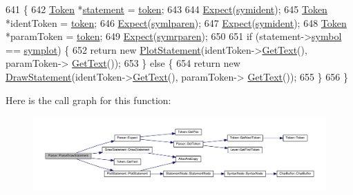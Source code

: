\begin{DoxyCode}
641 \{
642     \hyperlink{structToken}{Token} *\hyperlink{nodes_8h_acac9cbaeea226ed297804c012dc12b16a338f0b1773c656a2647feb9e2bf6be09}{statement} = \hyperlink{classParser_a467028559d31c5b33f16ca8be56715cc}{token};
643 
644     \hyperlink{classParser_a811765334b0cd3f01152c35c9f5bcaec}{Expect}(\hyperlink{lex_8h_a7feef761cd73fac6e25b8bb80d2c4e54ade7694e5efc9616383548e57122faea5}{symident});
645     \hyperlink{structToken}{Token} *identToken = \hyperlink{classParser_a467028559d31c5b33f16ca8be56715cc}{token};
646     \hyperlink{classParser_a811765334b0cd3f01152c35c9f5bcaec}{Expect}(\hyperlink{lex_8h_a7feef761cd73fac6e25b8bb80d2c4e54ad92b5471ad4a0b9fc95faae6ca2172ad}{symlparen});
647     \hyperlink{classParser_a811765334b0cd3f01152c35c9f5bcaec}{Expect}(\hyperlink{lex_8h_a7feef761cd73fac6e25b8bb80d2c4e54ade7694e5efc9616383548e57122faea5}{symident});
648     \hyperlink{structToken}{Token} *paramToken = \hyperlink{classParser_a467028559d31c5b33f16ca8be56715cc}{token};
649     \hyperlink{classParser_a811765334b0cd3f01152c35c9f5bcaec}{Expect}(\hyperlink{lex_8h_a7feef761cd73fac6e25b8bb80d2c4e54a59c8837a9f31298813b4703cefbd185e}{symrparen});
650 
651     \textcolor{keywordflow}{if} (statement->\hyperlink{structToken_aa671eaaae5632c5277e89a090d864820}{symbol} == \hyperlink{lex_8h_a7feef761cd73fac6e25b8bb80d2c4e54acda5f0902987563127f09bff0f941be6}{symplot}) \{
652         \textcolor{keywordflow}{return} \textcolor{keyword}{new} \hyperlink{classPlotStatement}{PlotStatement}(identToken->\hyperlink{structToken_a15f1043de07ce8e452fbf115b85def71}{GetText}(), paramToken->
      \hyperlink{structToken_a15f1043de07ce8e452fbf115b85def71}{GetText}());
653     \} \textcolor{keywordflow}{else} \{
654         \textcolor{keywordflow}{return} \textcolor{keyword}{new} \hyperlink{classDrawStatement}{DrawStatement}(identToken->\hyperlink{structToken_a15f1043de07ce8e452fbf115b85def71}{GetText}(), paramToken->
      \hyperlink{structToken_a15f1043de07ce8e452fbf115b85def71}{GetText}());
655     \}
656 \}
\end{DoxyCode}


Here is the call graph for this function\+:\nopagebreak
\begin{figure}[H]
\begin{center}
\leavevmode
\includegraphics[width=350pt]{classParser_a38a55851f31c226c193090403dfbaff8_cgraph}
\end{center}
\end{figure}




